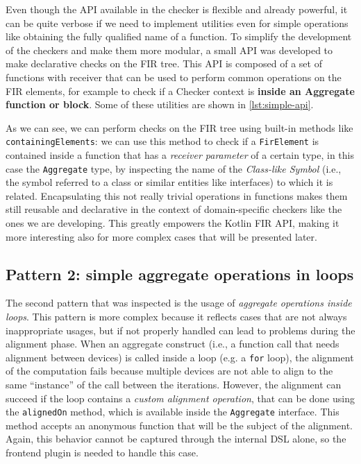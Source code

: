 \documentclass[12pt,a4paper,openright,twoside]{book}
\begin{document}
Even though the API available in the checker is flexible and already powerful,
it can be quite verbose if we need to implement utilities even for simple
operations like obtaining the fully qualified name of a function. To simplify
the development of the checkers and make them more modular, a small API was
developed to make declarative checks on the \ac{FIR} tree. This API is composed
of a set of functions with receiver that can be used to perform common
operations on the \ac{FIR} elements, for example to check if a Checker context
is \textbf{inside an Aggregate function or block}. Some of these utilities are
shown in \cref{lst:simple-api}.



As we can see, we can perform checks on the \ac{FIR} tree using built-in methods
like \lstinline{containingElements}: we can use this method to check if a
\lstinline{FirElement} is contained inside a function that has a \emph{receiver
parameter} of a certain type, in this case the \lstinline{Aggregate} type, by
inspecting the name of the \emph{Class-like Symbol} (i.e., the symbol referred
to a class or similar entities like interfaces) to which it is related. 
%
Encapsulating this not really trivial operations in functions makes them still
reusable and declarative in the context of domain-specific checkers like the
ones we are developing. This greatly empowers the Kotlin \ac{FIR} API, making it
more interesting also for more complex cases that will be presented later.

\subsection{Pattern 2: simple aggregate operations in loops}

The second pattern that was inspected is the usage of \emph{aggregate operations
inside loops}. This pattern is more complex because it reflects cases that are
not always inappropriate usages, but if not properly handled can lead to
problems during the alignment phase. 
%
When an aggregate construct (i.e., a function call that needs alignment between
devices) is called inside a loop (e.g. a \lstinline{for} loop), the alignment of
the computation fails because multiple devices are not able to align to the same
``instance'' of the call between the iterations. 
%
However, the alignment can succeed if the loop contains a \emph{custom alignment
operation}, that can be done using the \lstinline{alignedOn} method, which is
available inside the \lstinline{Aggregate} interface. This method accepts an
anonymous function that will be the subject of the alignment. 
%
Again, this behavior cannot be captured through the internal DSL alone, so the
frontend plugin is needed to handle this case. 
\end{document}
